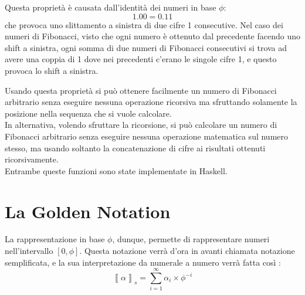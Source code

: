 \documentclass[Lau]{sapthesis}
\begin{document}
\medskip

Questa proprietà è causata dall'identità dei numeri in base $\phi$:
$$1.00 = 0.11$$
che provoca uno slittamento a sinistra di due cifre 1 consecutive. Nel caso dei numeri di Fibonacci, visto che ogni numero è ottenuto dal precedente facendo uno shift a sinistra, ogni somma di due numeri di Fibonacci consecutivi si trova ad avere una coppia di 1 dove nei precedenti c'erano le singole cifre 1, e questo provoca lo shift a sinistra.

\medskip

Usando questa proprietà si può ottenere facilmente un numero di Fibonacci arbitrario senza eseguire nessuna operazione ricorsiva ma sfruttando solamente la posizione nella sequenza che si vuole calcolare.\\
In alternativa, volendo sfruttare la ricorsione, si può calcolare un numero di Fibonacci arbitrario senza eseguire nessuna operazione matematica sul numero stesso, ma usando soltanto la concatenazione di cifre ai risultati ottenuti ricorsivamente.\\
Entrambe queste funzioni sono state implementate in Haskell. 



\chapter{La Golden Notation}
La rappresentazione in base $\phi$, dunque, permette di rappresentare numeri nell'intervallo $\left[0,\phi\right]$. Questa notazione verrà d'ora in avanti chiamata notazione semplificata, e la sua interpretazione da numerale a numero verrà fatta così \cite{PietroDiGianantonio}:
$$\left\llbracket \alpha \right\rrbracket_s = \sum_{i=1}^{\infty} \alpha_i \times \phi^{-i}$$
\end{document}
